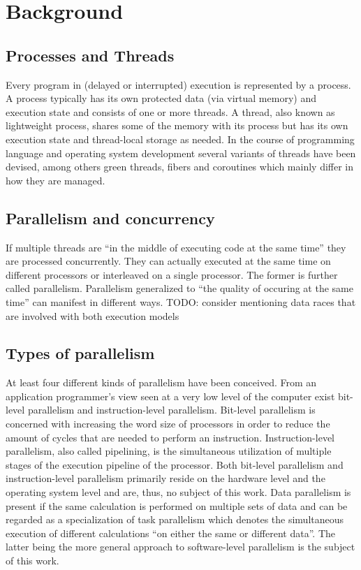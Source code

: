\chapter{Background}

\section{Processes and Threads}
Every program in (delayed or interrupted) execution is represented by a process. A process typically has its own protected data (via virtual memory) and execution state and consists of one or more threads. A thread, also known as lightweight process, shares some of the memory with its process but has its own execution state and thread-local storage as needed\cite[p.~20]{PrinciplesOfModernOS}. In the course of programming language and operating system development several variants of threads have been devised, among others green threads, fibers and coroutines which mainly differ in how they are managed.

\section{Parallelism and concurrency}
If multiple threads are ``in the middle of executing code at the same time''\cite[p.~124(?)]{MultiProgWithJavaTech} they are processed concurrently. They can  actually executed at the same time on different processors or interleaved on a single processor. The former is further called parallelism. Parallelism generalized to ``the quality of occuring at the same time''\cite[p.~91]{OSs_AConceptBasedApproach} can manifest in different ways.
TODO: consider mentioning data races that are involved with both execution models

\section{Types of parallelism}
At least four different kinds of parallelism have been conceived. From an application programmer's view seen at a very low level of the computer exist bit-level parallelism and instruction-level parallelism. Bit-level parallelism is concerned with increasing the word size of processors in order to reduce the amount of cycles that are needed to perform an instruction\cite[p.~15]{ParCompArchitecture_HW/SW_Approach}. Instruction-level parallelism, also called pipelining, is the simultaneous utilization of multiple stages of the execution pipeline of the processor. Both bit-level parallelism and instruction-level parallelism primarily reside on the hardware level and the operating system level and are, thus, no subject of this work. Data parallelism is present if the same calculation is performed on multiple sets of data and can be regarded as a specialization of task parallelism which denotes the simultaneous execution of different calculations ``on either the same or different data''\cite[p.~125]{ParCompArchitecture_HW/SW_Approach}. The latter being the more general approach to software-level parallelism is the subject of this work.

